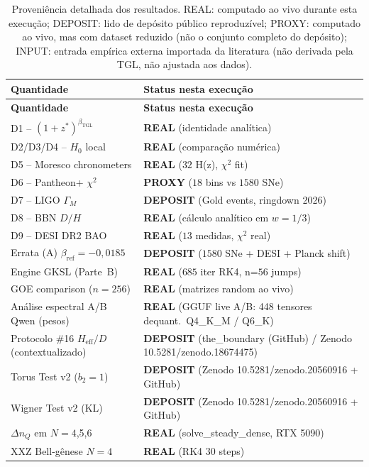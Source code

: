 \documentclass[12pt,a4paper]{article}
\newcommand{\betatgl}{\beta_{\text{TGL}}}
\newcommand{\TGL}{\textsc{TGL}}
\begin{document}
\begin{longtable}{p{} p{}}
\caption{Proveniência detalhada dos resultados.  REAL: computado ao vivo
durante esta execução; DEPOSIT: lido de depósito público reproduzível;
PROXY: computado ao vivo, mas com dataset reduzido (não o conjunto
completo do depósito); INPUT: entrada empírica externa importada da
literatura (não derivada pela \TGL{}, não ajustada aos dados).}\label{tab:provenance}\\
\toprule
\textbf{Quantidade} & \textbf{Status nesta execução} \\
\midrule
\endfirsthead
\toprule
\textbf{Quantidade} & \textbf{Status nesta execução} \\
\midrule
\endhead
D1 -- $(1+z^*)^{\betatgl}$ & \textbf{REAL} (identidade analítica) \\
D2/D3/D4 -- $H_0$ local & \textbf{REAL} (comparação numérica) \\
D5 -- Moresco chronometers & \textbf{REAL} ($32$ H(z), $\chi^2$ fit) \\
D6 -- Pantheon+ $\chi^2$ & \textbf{PROXY} ($18$ bins vs $1580$ SNe) \\
D7 -- LIGO $\Gamma_M$ & \textbf{DEPOSIT} (Gold events, ringdown 2026) \\
D8 -- BBN $D/H$ & \textbf{REAL} (cálculo analítico em $w=1/3$) \\
D9 -- DESI DR2 BAO & \textbf{REAL} ($13$ medidas, $\chi^2$ real) \\
Errata (A) $\beta_{\text{ref}} = -0{,}0185$ & \textbf{DEPOSIT} ($1580$ SNe + DESI + Planck shift) \\
Engine GKSL (Parte~B) & \textbf{REAL} ($685$ iter RK4, n=$56$ jumps) \\
GOE comparison ($n=256$) & \textbf{REAL} (matrizes random ao vivo) \\
Análise espectral A/B Qwen (pesos) & \textbf{REAL} (GGUF live A/B: 448 tensores dequant.\ Q4\_K\_M / Q6\_K) \\
Protocolo \#16 $H_{\text{eff}}/D$ (contextualizado) & \textbf{DEPOSIT} (the\_boundary (GitHub) / Zenodo 10.5281/zenodo.18674475) \\
Torus Test v2 ($b_2=1$) & \textbf{DEPOSIT} (Zenodo 10.5281/zenodo.20560916 + GitHub) \\
Wigner Test v2 (KL) & \textbf{DEPOSIT} (Zenodo 10.5281/zenodo.20560916 + GitHub) \\
$\Delta n_Q$ em $N=4$,5,6 & \textbf{REAL} (solve\_steady\_dense, RTX 5090) \\
XXZ Bell-gênese $N=4$ & \textbf{REAL} (RK4 $30$ steps) \\

\end{longtable}
\end{document}
